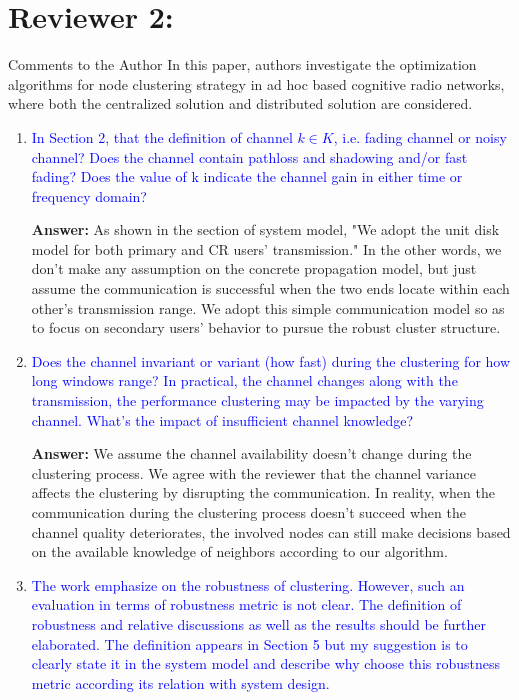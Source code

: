 \documentclass[10pt,a4paper]{article}
\begin{document}
\section{Reviewer 2:}

Comments to the Author
In this paper, authors investigate the optimization algorithms for node clustering strategy in ad hoc based cognitive radio networks, where both the centralized solution and distributed solution are considered.
\begin{enumerate}


\item \textcolor{blue}{ In Section 2, that the definition of channel $k\in K$, i.e. fading channel or noisy channel? Does the channel contain pathloss and shadowing and/or fast fading? Does the value of k indicate the channel gain in either time or frequency domain? }

\textbf{Answer:} As shown in the section of system model, "We adopt the unit disk model for both primary and CR users’ transmission."
In the other words, we don't make any assumption on the concrete propagation model, but just assume the communication is successful when the two ends locate within each other's transmission range.
We adopt this simple communication model so as to focus on secondary users' behavior to pursue the robust cluster structure.

\item \textcolor{blue}{ Does the channel invariant or variant (how fast) during the clustering for how long windows range? In practical, the channel changes along with the transmission, the performance clustering may be impacted by the varying channel. What's the impact of insufficient channel knowledge?}

\textbf{Answer:} We assume the channel availability doesn't change during the clustering process.
We agree with the reviewer that the channel variance affects the clustering by disrupting the communication.
In reality, when the communication during the clustering process doesn't succeed when the channel quality deteriorates, the involved nodes can still make decisions based on the available knowledge of neighbors according to our algorithm.


\item \textcolor{blue}{ The work emphasize on the robustness of clustering. However, such an evaluation in terms of robustness metric is not clear. The definition of robustness and relative discussions as well as the results should be further elaborated. The definition appears in Section 5 but my suggestion is to clearly state it in the system model and describe why choose this robustness metric according its relation with system design.}


\end{enumerate}
\end{document}
